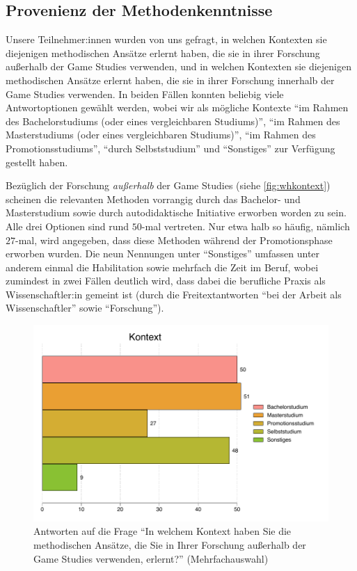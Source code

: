 \documentclass{scrartcl}
\begin{document}
\subsection{Provenienz der Methodenkenntnisse}\label{sec:resultate_provenienz}
Unsere Teilnehmer:innen wurden von uns gefragt, in welchen Kontexten sie diejenigen methodischen Ansätze erlernt haben, die sie in ihrer Forschung außerhalb der Game Studies verwenden, und in welchen Kontexten sie diejenigen methodischen Ansätze erlernt haben, die sie in ihrer Forschung innerhalb der Game Studies verwenden.
In beiden Fällen konnten beliebig viele Antwortoptionen gewählt werden, wobei wir als mögliche Kontexte \enquote{im Rahmen des Bachelorstudiums (oder eines vergleichbaren Studiums)}, \enquote{im Rahmen des Masterstudiums (oder eines vergleichbaren Studiums)}, \enquote{im Rahmen des Promotionsstudiums}, \enquote{durch Selbststudium} und \enquote{Sonstiges} zur Verfügung gestellt haben.

Bezüglich der Forschung \textit{außerhalb} der Game Studies (siehe \autoref{fig:whkontext}) scheinen die relevanten Methoden vorrangig durch das Bachelor- und Masterstudium sowie durch autodidaktische Initiative erworben worden zu sein.
Alle drei Optionen sind rund $50$-mal vertreten.
Nur etwa halb so häufig, nämlich $27$-mal, wird angegeben, dass diese Methoden während der Promotionsphase erworben wurden.
Die neun Nennungen unter \enquote{Sonstiges} umfassen unter anderem einmal die Habilitation sowie mehrfach die Zeit im Beruf, wobei zumindest in zwei Fällen deutlich wird, dass dabei die berufliche Praxis als Wissenschaftler:in gemeint ist (durch die Freitextantworten \enquote{bei der Arbeit als Wissenschaftler} sowie \enquote{Forschung}).

\begin{figure}[ht]
   \includegraphics[width=1\textwidth]{whkontext.pdf}
   \caption{Antworten auf die Frage \enquote{In welchem Kontext haben Sie die methodischen Ansätze, die Sie in Ihrer Forschung außerhalb der Game Studies verwenden, erlernt?} (Mehrfachauswahl)}
   \label{fig:whkontext}
\end{figure}
\end{document}
